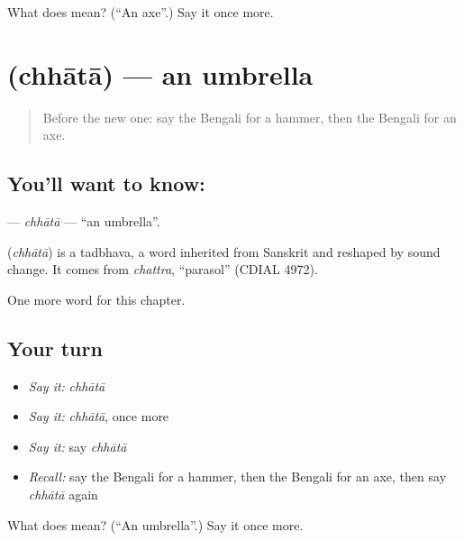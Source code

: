 \begin{tcolorbox}[breakable,colback=teal!4,colframe=teal!35!black,title={Before you move on}]
What does  mean? (\textquotedblleft{}An axe\textquotedblright{}.) Say it once more.
\end{tcolorbox}
\section[\texorpdfstring{\bn{ছাতা} (chhātā)}{ছাতা (chhātā)}]{ (chhātā) — an umbrella}

\label{lesson:BN-C111-chhata}



\begin{quote}
Before the new one: say the Bengali for a hammer, then the Bengali for an axe.
\end{quote}

\subsection*{You'll want to know: }
\textbf{} — \emph{chhātā} — \textquotedblleft{}an umbrella\textquotedblright{}.

\begin{cousinweb}
\textbf{} (\emph{chhātā}) is a tadbhava, a word inherited from Sanskrit and reshaped by sound change. It comes from \emph{chattra}, \textquotedblleft{}parasol\textquotedblright{} (CDIAL 4972).
\end{cousinweb}

\begin{grammarlens}[title={What you've built}]
One more word for this chapter.
\end{grammarlens}

\subsection*{Your turn}
\begin{itemize}
\raggedright
  \item \emph{Say it:} \emph{chhātā}
  \item \emph{Say it:} \emph{chhātā}, once more
  \item \emph{Say it:} say \emph{chhātā}
  \item \emph{Recall:} say the Bengali for a hammer, then the Bengali for an axe, then say \emph{chhātā} again
\end{itemize}

\begin{tcolorbox}[breakable,colback=teal!4,colframe=teal!35!black,title={Before you move on}]
What does  mean? (\textquotedblleft{}An umbrella\textquotedblright{}.) Say it once more.
\end{tcolorbox}
